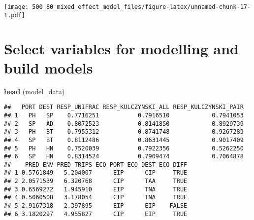 \documentclass[]{article}
\newenvironment{Shaded}{\begin{snugshade}}{\end{snugshade}}
\newcommand{\KeywordTok}[1]{\textcolor[rgb]{0.13,0.29,0.53}{\textbf{#1}}}
\newcommand{\DataTypeTok}[1]{\textcolor[rgb]{0.13,0.29,0.53}{#1}}
\newcommand{\StringTok}[1]{\textcolor[rgb]{0.31,0.60,0.02}{#1}}
\newcommand{\CommentTok}[1]{\textcolor[rgb]{0.56,0.35,0.01}{\textit{#1}}}
\newcommand{\OperatorTok}[1]{\textcolor[rgb]{0.81,0.36,0.00}{\textbf{#1}}}
\newcommand{\NormalTok}[1]{#1}
\begin{document}
\begin{Shaded}
\end{Shaded}

\texttt{[image: 500\_80\_mixed\_effect\_model\_files/figure-latex/unnamed-chunk-17-1.pdf]}

\section{Select variables for modelling and build
models}\label{select-variables-for-modelling-and-build-models}

\begin{Shaded}
\begin{Highlighting}[]
\KeywordTok{head}\NormalTok{ (model_data)}
\end{Highlighting}
\end{Shaded}

\begin{verbatim}
##   PORT DEST RESP_UNIFRAC RESP_KULCZYNSKI_ALL RESP_KULCZYNSKI_PAIR
## 1   PH   SP    0.7716251           0.7916510            0.7941053
## 2   SP   AD    0.8072523           0.8141850            0.8929739
## 3   PH   BT    0.7955312           0.8741748            0.9267283
## 4   SP   BT    0.8112486           0.8631445            0.9017409
## 5   PH   HN    0.7520039           0.7922356            0.5262250
## 6   SP   HN    0.8314524           0.7909474            0.7064878
##    PRED_ENV PRED_TRIPS ECO_PORT ECO_DEST ECO_DIFF
## 1 0.5761849   5.204007      EIP      CIP     TRUE
## 2 2.0571539   6.320768      CIP      TAA     TRUE
## 3 0.6569272   1.945910      EIP      TNA     TRUE
## 4 0.5060508   3.178054      CIP      TNA     TRUE
## 5 2.9167318   2.397895      EIP      EIP    FALSE
## 6 3.1820297   4.955827      CIP      EIP     TRUE
\end{verbatim}
\end{document}
